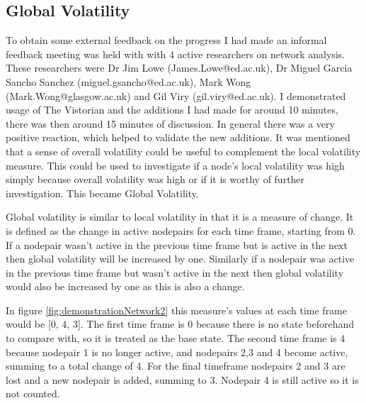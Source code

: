 
\subsection{Global Volatility}

To obtain some external feedback on the progress I had made an informal feedback meeting was held with with 4 active researchers on network analysis. These researchers were Dr Jim Lowe (James.Lowe@ed.ac.uk), Dr Miguel Garcia Sancho Sanchez (miguel.gsancho@ed.ac.uk), Mark Wong (Mark.Wong@glasgow.ac.uk) and Gil Viry (gil.viry@ed.ac.uk). I demonstrated usage of The Vistorian and the additions I had made for around 10 minutes, there was then around 15 minutes of discussion. In general there was a very positive reaction, which helped to validate the new additions. It was mentioned that a sense of overall volatility could be useful to complement the local volatility measure. This could be used to investigate if a node's local volatility was high simply because overall volatility was high or if it is worthy of further investigation. This became Global Volatility.

Global volatility is similar to local volatility in that it is a measure of change. It is defined as the change in active nodepairs for each time frame, starting from 0. If a nodepair wasn't active in the previous time frame but is active in the next then global volatility will be increased by one. Similarly if a nodepair was active in the previous time frame but wasn't active in the next then global volatility would also be increased by one as this is also a change. 

In figure \ref{fig:demonstrationNetwork2} this measure's values at each time frame would be [0, 4, 3]. The first time frame is 0 because there is no state beforehand to compare with, so it is treated as the base state. The second time frame is 4 because nodepair 1 is no longer active, and nodepairs 2,3 and 4 become active, summing to a total change of 4. For the final timeframe nodepairs 2 and 3 are lost and a new nodepair is added, summing to 3. Nodepair 4 is still active so it is not counted.

